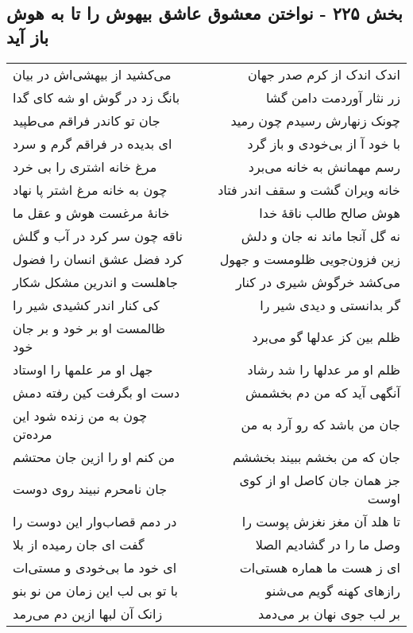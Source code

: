 \begin{center}
\section*{بخش ۲۲۵ - نواختن معشوق عاشق بیهوش را تا به هوش باز آید}
\label{sec:sh225}
\begin{longtable}{l p{0.5cm} r}
می‌کشید از بیهشی‌اش در بیان
&&
اندک اندک از کرم صدر جهان
\\
بانگ زد در گوش او شه کای گدا
&&
زر نثار آوردمت دامن گشا
\\
جان تو کاندر فراقم می‌طپید
&&
چونک زنهارش رسیدم چون رمید
\\
ای بدیده در فراقم گرم و سرد
&&
با خود آ از بی‌خودی و باز گرد
\\
مرغ خانه اشتری را بی خرد
&&
رسم مهمانش به خانه می‌برد
\\
چون به خانه مرغ اشتر پا نهاد
&&
خانه ویران گشت و سقف اندر فتاد
\\
خانهٔ مرغست هوش و عقل ما
&&
هوش صالح طالب ناقهٔ خدا
\\
ناقه چون سر کرد در آب و گلش
&&
نه گل آنجا ماند نه جان و دلش
\\
کرد فضل عشق انسان را فضول
&&
زین فزون‌جویی ظلومست و جهول
\\
جاهلست و اندرین مشکل شکار
&&
می‌کشد خرگوش شیری در کنار
\\
کی کنار اندر کشیدی شیر را
&&
گر بدانستی و دیدی شیر را
\\
ظالمست او بر خود و بر جان خود
&&
ظلم بین کز عدلها گو می‌برد
\\
جهل او مر علمها را اوستاد
&&
ظلم او مر عدلها را شد رشاد
\\
دست او بگرفت کین رفته دمش
&&
آنگهی آید که من دم بخشمش
\\
چون به من زنده شود این مرده‌تن
&&
جان من باشد که رو آرد به من
\\
من کنم او را ازین جان محتشم
&&
جان که من بخشم ببیند بخششم
\\
جان نامحرم نبیند روی دوست
&&
جز همان جان کاصل او از کوی اوست
\\
در دمم قصاب‌وار این دوست را
&&
تا هلد آن مغز نغزش پوست را
\\
گفت ای جان رمیده از بلا
&&
وصل ما را در گشادیم الصلا
\\
ای خود ما بی‌خودی و مستی‌ات
&&
ای ز هست ما هماره هستی‌ات
\\
با تو بی لب این زمان من نو بنو
&&
رازهای کهنه گویم می‌شنو
\\
زانک آن لبها ازین دم می‌رمد
&&
بر لب جوی نهان بر می‌دمد
\\

\end{longtable}
\end{center}
